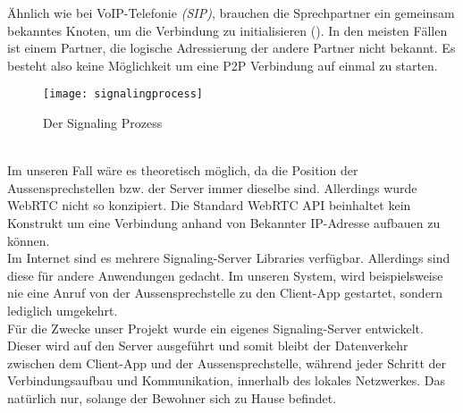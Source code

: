 Ähnlich wie bei VoIP-Telefonie \textit{(SIP)}, brauchen die Sprechpartner ein gemeinsam bekanntes Knoten, um die Verbindung zu initialisieren (). In den meisten Fällen ist einem Partner, die logische Adressierung der andere Partner nicht bekannt. Es besteht also keine Möglichkeit um eine P2P Verbindung auf einmal zu starten. 
\begin{figure}[htb!]
	\begin{center}
		\texttt{[image: signalingprocess]}
		\caption[Der Signaling Prozess]{Der Signaling Prozess}
		\label{fig:signaling}
	\end{center}
\end{figure}
\\
Im unseren Fall wäre es theoretisch möglich, da die Position der Aussensprechstellen bzw. der Server immer dieselbe sind. Allerdings wurde WebRTC nicht so konzipiert. Die Standard WebRTC API beinhaltet kein Konstrukt um eine Verbindung anhand von Bekannter IP-Adresse aufbauen zu können.
\\
Im Internet sind es mehrere Signaling-Server Libraries verfügbar. Allerdings sind diese für andere Anwendungen gedacht. Im unseren System, wird beispielsweise nie eine Anruf von der Aussensprechstelle zu den Client-App gestartet, sondern lediglich umgekehrt.
\\
Für die Zwecke unser Projekt wurde ein eigenes Signaling-Server entwickelt. Dieser wird auf den Server ausgeführt und somit bleibt der Datenverkehr zwischen dem Client-App und der Aussensprechstelle, während jeder Schritt der Verbindungsaufbau und Kommunikation, innerhalb des lokales Netzwerkes. Das natürlich nur, solange der Bewohner sich zu Hause befindet.

